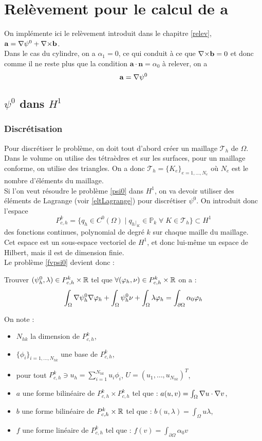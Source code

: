 \chapter{Relèvement pour le calcul de $\mathbf{a}$}
On implémente ici le relèvement introduit dans le chapitre \ref{relev}, $\mathbf{a}={\nabla}\psi^0+{\nabla\times}\mathbf{b}$.\\
Dans le cas du cylindre, on a $\alpha_1=0$, ce qui conduit à ce que ${\nabla\times} \mathbf{b}=0$ et donc comme il ne reste plus que la condition $\mathbf{a}\cdot\mathbf{n}=\alpha_0$ à relever, on a \[ \mathbf{a}={\nabla}\psi^0 \]

\section{$\psi^0$ dans $H^1$}
\label{impGradh1}
\subsection{Discrétisation}
Pour discrétiser le problème, on doit tout d'abord créer un maillage $\mathcal{T}_h$ de $\Omega$. Dans le volume on utilise des tétraèdres et sur les surfaces, pour un maillage conforme, on utilise des triangles. On a donc $\mathcal{T}_h=\{K_e\}_{e=1,\dots,N_e}$ où $N_e$ est le nombre d'éléments du maillage.\\
Si l'on veut résoudre le problème \ref{psi0} dans $H^1$, on va devoir utiliser des éléments de Lagrange (voir \ref{eltLagrange}) pour discrétiser $\psi^0$. On introduit donc l'espace
\[   P^k_{c,h} = \{ q_h \in C^0(\Omega) \; |\; q_h{}_{|_K} \in \mathbb{P}_k\; \forall\; K \in \mathcal{T}_h\} \subset H^1 \]
des fonctions continues, polynomial de degré $k$ sur chaque maille du maillage.\\
Cet espace est un sous-espace vectoriel de $H^1$, et donc lui-même un espace de Hilbert, mais il est de dimension finie.\\

Le problème \ref{fvpsi0} devient donc :
\begin{pb}\label{dcpsi0}
Trouver $(\psi^0_h, \lambda)\in P^k_{c,h}\times {\mathbb{R}}$ tel que $\forall (\varphi_h,\nu)\in P^k_{c,h}\times {\mathbb{R}}$ on a :
\[ \int_\Omega{\nabla} \psi^0_h{\nabla}\varphi_h + \int_\Omega \psi^0_h\nu + \int_\Omega \lambda\varphi_h = \int_{\partial\Omega} \alpha_0\varphi_h \]
\end{pb}

On note :
\begin{itemize}
\item $N_{hk}$ la dimension de $P^k_{c,h}$,
\item $\{\phi_i\}_{i=1,\dots,N_{hk}}$ une base de $P^k_{c,h}$,
\item pour tout $P^k_{c,h}\ni u_h=\sum_{i=1}^{N_{hk}} u_i\phi_i$, $U=(u_1,\dots,u_{N_{hk}})^T$,
\item $a$ une forme bilinéaire de $P^k_{c,h}\times P^k_{c,h}$ tel que : $a(u,v)=\int_\Omega {\nabla} u\cdot {\nabla} v$,
\item $b$ une forme bilinéaire de $P^k_{c,h}\times{\mathbb{R}}$ tel que : $b(u,\lambda) = \int_\Omega u\lambda$,
\item $f$ une forme linéaire de $P^k_{c,h}$ tel que : $f(v)=\int_{\partial\Omega} \alpha_0 v$
\end{itemize}

